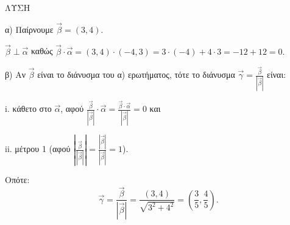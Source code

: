 \noindent ΛΥΣΗ

\medskip

α) Παίρνουμε $\vec{\beta} = (3,4)$.

$\vec{\beta} \perp \vec{\alpha}$ καθώς $\vec{\beta} \cdot \vec{\alpha} = (3,4) \cdot (-4,3) = 3 \cdot (-4) + 4 \cdot 3 = -12 + 12 = 0.$

\medskip

β) Αν $\vec{\beta}$ είναι το διάνυσμα του α) ερωτήματος, τότε το διάνυσμα $\vec{\gamma} = \frac{\vec{\beta}}{|\vec{\beta}|}$ είναι:

i. κάθετο στο $\vec{\alpha}$, αφού $\frac{\vec{\beta}}{|\vec{\beta}|} \cdot \vec{\alpha} = \frac{\vec{\beta}\cdot\vec{\alpha}}{|\vec{\beta}|} = 0$ και

ii. μέτρου 1 (αφού $\left| \frac{\vec{\beta}}{|\vec{\beta}|} \right| = \frac{|\vec{\beta}|}{|\vec{\beta}|} = 1$).

Οπότε:
\[
\vec{\gamma} = \frac{\vec{\beta}}{|\vec{\beta}|} = \frac{(3,4)}{\sqrt{3^2+4^2}} = \left( \frac{3}{5}, \frac{4}{5} \right).
\]
\endlysh